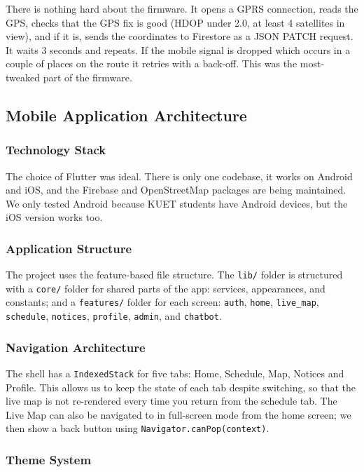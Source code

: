 \documentclass[12pt,a4paper]{report}
\begin{document}
There is nothing hard about the firmware. It opens a GPRS connection, reads the GPS, checks that the GPS fix is good (HDOP under 2.0, at least 4 satellites in view), and if it is, sends the coordinates to Firestore as a JSON PATCH request. It waits 3 seconds and repeats. If the mobile signal is dropped which occurs in a couple of places on the route it retries with a back-off. This was the most-tweaked part of the firmware.

\subsection{Mobile Application Architecture}

\subsubsection{Technology Stack}

The choice of Flutter was ideal. There is only one codebase, it works on Android and iOS, and the Firebase and OpenStreetMap packages are being maintained. We only tested Android because KUET students have Android devices, but the iOS version works too.

\subsubsection{Application Structure}

The project uses the feature-based file structure. The \texttt{lib/} folder is structured with a \texttt{core/} folder for shared parts of the app: services, appearances, and constants; and a \texttt{features/} folder for each screen: \texttt{auth}, \texttt{home}, \texttt{live\_map}, \texttt{schedule}, \texttt{notices}, \texttt{profile}, \texttt{admin}, and \texttt{chatbot}.

\subsubsection{Navigation Architecture}

The shell has a \texttt{IndexedStack} for five tabs: Home, Schedule, Map, Notices and Profile. This allows us to keep the state of each tab despite switching, so that the live map is not re-rendered every time you return from the schedule tab. The Live Map can also be navigated to in full-screen mode from the home screen; we then show a back button using \texttt{Navigator.canPop(context)}.

\subsubsection{Theme System}
\end{document}
